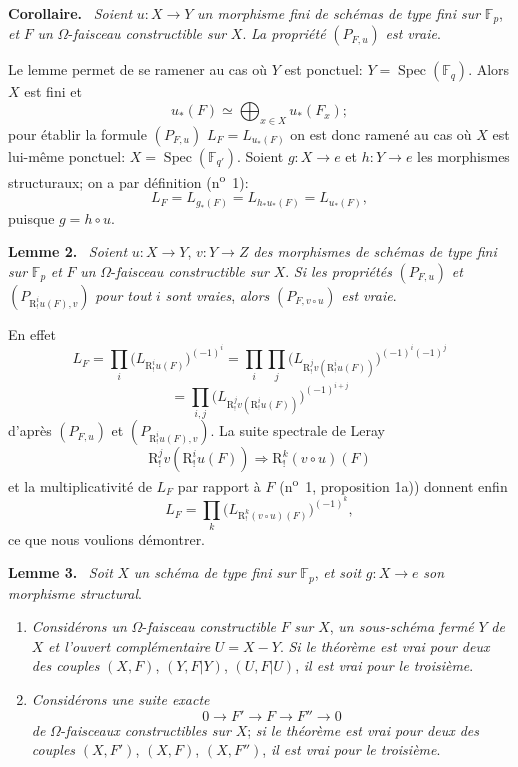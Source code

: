 \documentclass[11pt]{article}
\newenvironment{statement}[1]{\par\medskip\noindent\textbf{#1.}\ }{\par\medskip}
\DeclareMathOperator{\Spec}{Spec}
\providecommand{\Spec}{\operatorname{Spec}}
\providecommand{\Spec}{\operatorname{Spec}}
\providecommand{\Spec}{\operatorname{Spec}}
\providecommand{\Spec}{\operatorname{Spec}}
\begin{document}
\begin{statement}{Corollaire}
\emph{Soient} $u:X\to Y$ \emph{un morphisme fini de schémas de type fini sur} $\mathbb F_p$, \emph{et} $F$ \emph{un} $\Omega$-\emph{faisceau constructible sur} $X$. \emph{La propriété} $(P_{F,u})$ \emph{est vraie}.
\end{statement}

Le lemme permet de se ramener au cas où $Y$ est ponctuel: $Y=\Spec(\mathbb F_q)$. Alors $X$ est fini et
\[
u_*(F)\simeq \bigoplus_{x\in X}u_*(F_x);
\]
pour établir la formule $(P_{F,u})$ $L_F=L_{u_*(F)}$ on est donc ramené au cas où $X$ est lui-même ponctuel: $X=\Spec(\mathbb F_{q'})$. Soient $g:X\to e$ et $h:Y\to e$ les morphismes structuraux; on a par définition (n\textsuperscript{o}~1):
\[
L_F=L_{g_*(F)}=L_{h_*u_*(F)}=L_{u_*(F)},
\]
puisque $g=h\circ u$.

\begin{statement}{Lemme 2}
\emph{Soient} $u:X\to Y$, $v:Y\to Z$ \emph{des morphismes de schémas de type fini sur} $\mathbb F_p$ \emph{et} $F$ \emph{un} $\Omega$-\emph{faisceau constructible sur} $X$. \emph{Si les propriétés} $(P_{F,u})$ \emph{et} $(P_{\mathrm{R}^i_!u(F),v})$ \emph{pour tout} $i$ \emph{sont vraies}, \emph{alors} $(P_{F,v\circ u})$ \emph{est vraie}.
\end{statement}

En effet
\[
L_F=\prod_i\bigl(L_{\mathrm{R}^i_!u(F)}\bigr)^{(-1)^i}
 =\prod_i\prod_j\bigl(L_{\mathrm{R}^j_!v(\mathrm{R}^i_!u(F))}\bigr)^{(-1)^i(-1)^j}
\]
\[
=\prod_{i,j}\bigl(L_{\mathrm{R}^j_!v(\mathrm{R}^i_!u(F))}\bigr)^{(-1)^{i+j}}
\]
d'après $(P_{F,u})$ et $(P_{\mathrm{R}^i_!u(F),v})$. La suite spectrale de Leray
\[
\mathrm{R}^j_!v(\mathrm{R}^i_!u(F))\Longrightarrow \mathrm{R}^k_!(v\circ u)(F)
\]
et la multiplicativité de $L_F$ par
rapport à $F$ (n\textsuperscript{o}~1, proposition 1a)) donnent enfin
\[
L_F=\prod_k\bigl(L_{\mathrm{R}^k_!(v\circ u)(F)}\bigr)^{(-1)^k},
\]
ce que nous voulions démontrer.

\begin{statement}{Lemme 3}
\emph{Soit} $X$ \emph{un schéma de type fini sur} $\mathbb F_p$, \emph{et soit} $g:X\to e$ \emph{son morphisme structural}.
\begin{enumerate}[label=\alph*)]
\item \emph{Considérons un} $\Omega$-\emph{faisceau constructible} $F$ \emph{sur} $X$, \emph{un sous-schéma fermé} $Y$ \emph{de} $X$ \emph{et l'ouvert complémentaire} $U=X-Y$. \emph{Si le théorème est vrai pour deux des couples} $(X,F)$, $(Y,F|Y)$, $(U,F|U)$, \emph{il est vrai pour le troisième}.
\item \emph{Considérons une suite exacte}
\[
0\longrightarrow F'\longrightarrow F\longrightarrow F''\longrightarrow0
\]
\emph{de} $\Omega$-\emph{faisceaux constructibles sur} $X$; \emph{si le théorème est vrai pour deux des couples} $(X,F')$, $(X,F)$, $(X,F'')$, \emph{il est vrai pour le troisième}.
\end{enumerate}
\end{statement}
\end{document}
